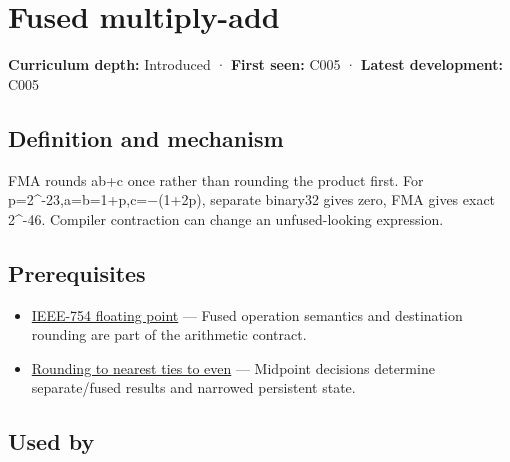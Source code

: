 \hypertarget{appendix-41e8ef22a21e}{}\label{referencestart:appendix-41e8ef22a21e}
\section{Fused multiply-add}\label{appendix-41e8ef22a21e-fused-multiply-add}

\hypertarget{appendix-41e8ef22a21e-fused-multiply-add}{}

\textbf{Curriculum depth:} Introduced · \textbf{First seen:} C005 · \textbf{Latest development:} C005

\begin{allmightroledefinition}

\subsection{Definition and mechanism}\label{appendix-41e8ef22a21e-definition-and-mechanism}

\hypertarget{appendix-41e8ef22a21e-definition-and-mechanism}{}

FMA rounds ab+c once rather than rounding the product first. For p=2\^{}-23,a=b=1+p,c=−(1+2p), separate binary32 gives zero, FMA gives exact 2\^{}-46. Compiler contraction can change an unfused-looking expression.

\end{allmightroledefinition}

\subsection{Prerequisites}\label{appendix-41e8ef22a21e-prerequisites}

\hypertarget{appendix-41e8ef22a21e-prerequisites}{}

\begin{itemize}
\tightlist
\item
  \hyperref[appendix-343615f49ddf]{IEEE-754 floating point} --- Fused operation semantics and destination rounding are part of the arithmetic contract.
\item
  \hyperref[appendix-614afe1de592]{Rounding to nearest ties to even} --- Midpoint decisions determine separate/fused results and narrowed persistent state.
\end{itemize}

\subsection{Used by}\label{appendix-41e8ef22a21e-used-by}

